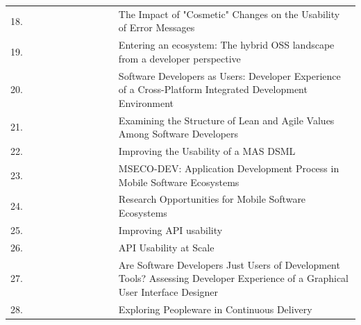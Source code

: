 \documentclass[english, 12pt, a4paper, sci, utf8, a-1b, online]{aaltothesis}
\begin{document}
\begin{center}
\begin{longtable}{p{0.05\linewidth}p{0.25\linewidth}p{0.7\linewidth}}
    18. & \cite{dong2019impact}                             & The Impact of "Cosmetic" Changes on the Usability of Error Messages                                                                         \\
    19. & \cite{entering-an-ecosystem}                      & Entering an ecosystem: The hybrid OSS landscape from a developer perspective                                                                \\
    20. & \cite{software-developers-as-users}               & Software Developers as Users: Developer Experience of a Cross-Platform Integrated Development Environment                                   \\
    21. & \cite{fagerholm2014examining}                     & Examining the Structure of Lean and Agile Values Among Software Developers                                                                  \\
    22. & \cite{miranda2018improving}                       & Improving the Usability of a MAS DSML                                                                                                       \\
    23. & \cite{fontao2016mseco}                            & MSECO-DEV: Application Development Process in Mobile Software Ecosystems                                                                    \\
    24. & \cite{fontao2015research}                         & Research Opportunities for Mobile Software Ecosystems                                                                                       \\
    25. & \cite{myers2016improving}                         & Improving API usability                                                                                                                     \\
    26. & \cite{macvean2016api}                             & API Usability at Scale                                                                                                                      \\
    27. & \cite{kuusinen2016software}                       & Are Software Developers Just Users of Development Tools? Assessing Developer Experience of a Graphical User Interface Designer              \\
    28. & \cite{karpanoja2016exploring}                     & Exploring Peopleware in Continuous Delivery                                                                                                 \\

\end{longtable}
\end{center}
\end{document}
